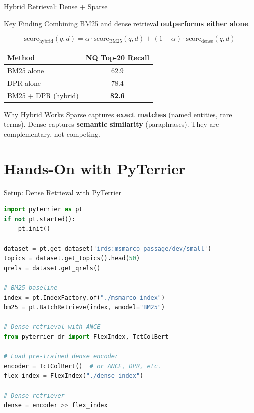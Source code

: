 \documentclass[aspectratio=169]{beamer}
\newif\ifanimated
\newcommand{\cpause}{\ifanimated\pause\fi}
\begin{document}
\begin{frame}{Hybrid Retrieval: Dense + Sparse}
\begin{block}{Key Finding}
Combining BM25 and dense retrieval \textbf{outperforms either alone}.
\end{block}

\vspace{0.5em}

$$\text{score}_{\text{hybrid}}(q, d) = \alpha \cdot \text{score}_{\text{BM25}}(q,d) + (1-\alpha) \cdot \text{score}_{\text{dense}}(q,d)$$

\vspace{0.5em}

\begin{center}
\begin{tabular}{lc}
\toprule
\textbf{Method} & \textbf{NQ Top-20 Recall} \\
\midrule
BM25 alone & 62.9 \\
DPR alone & 78.4 \\
BM25 + DPR (hybrid) & \textbf{82.6} \\
\bottomrule
\end{tabular}
\end{center}

\cpause
\vspace{0.5em}

\begin{exampleblock}{Why Hybrid Works}
Sparse captures \textbf{exact matches} (named entities, rare terms). Dense captures \textbf{semantic similarity} (paraphrases). They are complementary, not competing.
\end{exampleblock}
\end{frame}

\section{Hands-On with PyTerrier}

\begin{frame}[plain]
\sectionpage
\end{frame}

\begin{frame}[fragile]{Setup: Dense Retrieval with PyTerrier}
\begin{lstlisting}[language=Python]
import pyterrier as pt
if not pt.started():
    pt.init()

dataset = pt.get_dataset('irds:msmarco-passage/dev/small')
topics = dataset.get_topics().head(50)
qrels = dataset.get_qrels()

# BM25 baseline
index = pt.IndexFactory.of("./msmarco_index")
bm25 = pt.BatchRetrieve(index, wmodel="BM25")

# Dense retrieval with ANCE
from pyterrier_dr import FlexIndex, TctColBert

# Load pre-trained dense encoder
encoder = TctColBert()  # or ANCE, DPR, etc.
flex_index = FlexIndex("./dense_index")

# Dense retriever
dense = encoder >> flex_index
\end{lstlisting}
\end{frame}
\end{document}
